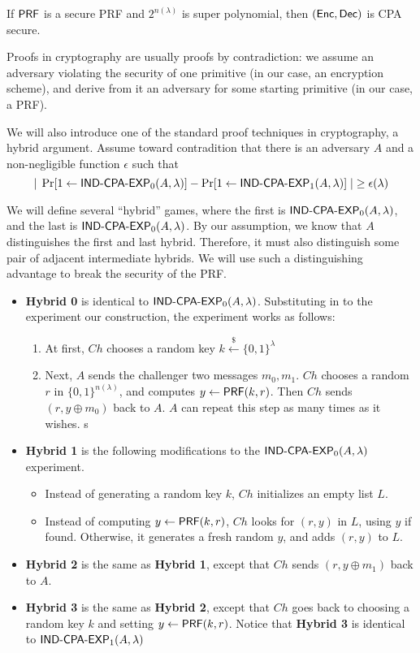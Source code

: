 \begin{theorem} If ${\sf PRF}$ is a secure PRF and $2^{n(\lambda)}$ is super polynomial, then $({\sf Enc},{\sf Dec})$ is CPA secure.
\end{theorem}

Proofs in cryptography are usually proofs by contradiction: we assume an adversary violating the security of one primitive (in our case, an encryption scheme), and derive from it an adversary for some starting primitive (in our case, a PRF).

We will also introduce one of the standard proof techniques in cryptography, a hybrid argument.  Assume toward contradition that there is an adversary $A$ and a non-negligible function $\epsilon$ such that
\[|\;\Pr[1\gets\text{\sf IND-CPA-EXP}_0(A,\lambda)]-\Pr[1\gets\text{\sf IND-CPA-EXP}_1(A,\lambda)]\;|\geq \epsilon(\lambda)\]

We will define several ``hybrid'' games, where the first is $\text{\sf IND-CPA-EXP}_0(A,\lambda)$, and the last is $\text{\sf IND-CPA-EXP}_0(A,\lambda)$.  By our assumption, we know that $A$ distinguishes the first and last hybrid.  Therefore, it must also distinguish some pair of adjacent intermediate hybrids.  We will use such a distinguishing advantage to break the security of the PRF.
\begin{itemize}
	\item {\bf Hybrid 0} is identical to $\text{\sf IND-CPA-EXP}_0(A,\lambda)$.  Substituting in to the experiment our construction, the experiment works as follows:
	\begin{enumerate}
		\item At first, $Ch$ chooses a random key $k\stackrel{\$}{\gets}\{0,1\}^\lambda$
		\item Next, $A$ sends the challenger two messages $m_0,m_1$.  $Ch$ chooses a random $r$ in $\{0,1\}^{n(\lambda)}$, and computes $y\gets{\sf PRF}(k,r)$.  Then $Ch$ sends $(r,y\oplus m_0)$ back to $A$.  $A$ can repeat this step as many times as it wishes.
		s	\end{enumerate}
	\item {\bf Hybrid 1} is the following modifications to the $\text{\sf IND-CPA-EXP}_0(A,\lambda)$ experiment.  
	\begin{itemize}
		\item Instead of generating a random key $k$, $Ch$ initializes an empty list $L$.
		\item Instead of computing $y\gets{\sf PRF}(k,r)$, $Ch$ looks for $(r,y)$ in $L$, using $y$ if found.  Otherwise, it generates a fresh random $y$, and adds $(r,y)$ to $L$.
	\end{itemize} 
	\item {\bf Hybrid 2} is the same as {\bf Hybrid 1}, except that $Ch$ sends $(r,y\oplus m_1)$ back to $A$.
	\item {\bf Hybrid 3} is the same as {\bf Hybrid 2}, except that $Ch$ goes back to choosing a random key $k$ and setting $y\gets{\sf PRF}(k,r)$.  Notice that {\bf Hybrid 3} is identical to $\text{\sf IND-CPA-EXP}_1(A,\lambda)$
\end{itemize}

